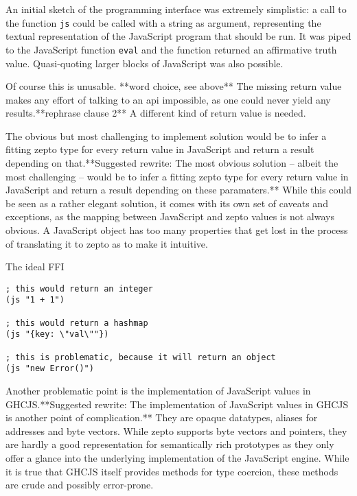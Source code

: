 \documentclass[oneside,11pt,xetex]{scrbook}
\begin{document}
An initial sketch of the programming interface was extremely simplistic: a call to the
function \texttt{js} could be called with a string as argument, representing the textual
representation of the JavaScript program that should be run. It was piped to the JavaScript
function \texttt{eval} and the function returned an affirmative truth value. Quasi-quoting
larger blocks of JavaScript was also possible.

Of course this is unusable. **word choice, see above** The missing return value makes any effort of talking to an
\gls{api} impossible, as one could never yield any results.**rephrase clause 2** A different kind of return
value is needed.

The obvious but most challenging to implement solution would be to infer a fitting zepto
type for every return value in JavaScript and return a result depending on that.**Suggested rewrite: The most obvious solution – albeit the most challenging – would be to infer a fitting zepto type for every return value in JavaScript and return a result depending on these paramaters.** While
this could be seen as a rather elegant solution, it comes with its own set of caveats
and exceptions, as the mapping between JavaScript and zepto values is not always obvious.
A JavaScript object has too many properties that get lost in the process of translating
it to zepto as to make it intuitive.

\begin{listing}[H]
\caption{The ideal FFI}
\begin{verbatim}
; this would return an integer
(js "1 + 1")

; this would return a hashmap
(js "{key: \"val\""})

; this is problematic, because it will return an object
(js "new Error()")
\end{verbatim}
\end{listing}

Another problematic point is the implementation of JavaScript values in GHCJS.**Suggested rewrite: The implementation of JavaScript values in GHCJS is another point of complication.** They
are opaque datatypes, aliases for addresses and byte vectors. While zepto supports
byte vectors and pointers, they are hardly a good representation for semantically rich
prototypes as they only offer a glance into the underlying implementation of the
JavaScript engine. While it is true that GHCJS itself provides methods for type
coercion, these methods are crude and possibly error-prone.
\end{document}
